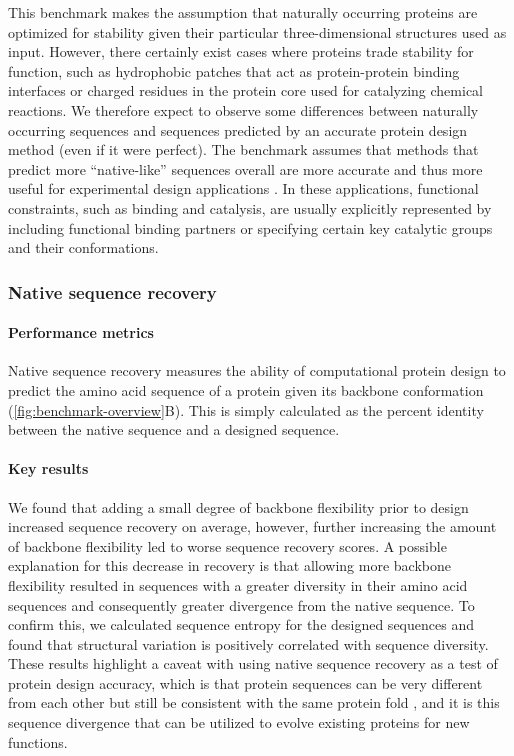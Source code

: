This benchmark makes the assumption that naturally occurring proteins are optimized for stability given their particular three-dimensional structures used as input. However, there certainly exist cases where proteins trade stability for function, such as hydrophobic patches that act as protein-protein binding interfaces or charged residues in the protein core used for catalyzing chemical reactions. We therefore expect to observe some differences between naturally occurring sequences and sequences predicted by an accurate protein design method (even if it were perfect). The benchmark assumes that methods that predict more ``native-like'' sequences overall are more accurate and thus more useful for experimental design applications \cite{kuhlman_native_2000}. In these applications, functional constraints, such as binding and catalysis, are usually explicitly represented by including functional binding partners or specifying certain key catalytic groups and their conformations.

\subsubsection{Native sequence recovery}

\paragraph{Performance metrics}

Native sequence recovery \cite{kuhlman_native_2000} measures the ability of computational protein design to predict the amino acid sequence of a protein given its backbone conformation (\cref{fig:benchmark-overview}B). This is simply calculated as the percent identity between the native sequence and a designed sequence.

\paragraph{Key results}

We found that adding a small degree of backbone flexibility prior to design increased sequence recovery on average, however, further increasing the amount of backbone flexibility led to worse sequence recovery scores. A possible explanation for this decrease in recovery is that allowing more backbone flexibility resulted in sequences with a greater diversity in their amino acid sequences and consequently greater divergence from the native sequence. To confirm this, we calculated sequence entropy for the designed sequences and found that structural variation is positively correlated with sequence diversity. These results highlight a caveat with using native sequence recovery as a test of protein design accuracy, which is that protein sequences can be very different from each other but still be consistent with the same protein fold \cite{yona_within_2002}, and it is this sequence divergence that can be utilized to evolve existing proteins for new functions.

